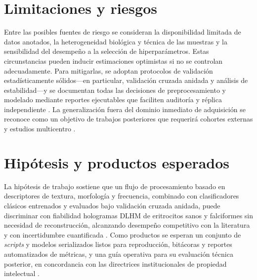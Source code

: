 \section{Limitaciones y riesgos}
Entre las posibles fuentes de riesgo se consideran la disponibilidad limitada de datos anotados, la heterogeneidad biológica y técnica de las muestras y la sensibilidad del desempeño a la selección de hiperparámetros. Estas circunstancias pueden inducir estimaciones optimistas si no se controlan adecuadamente. Para mitigarlas, se adoptan protocolos de validación estadísticamente sólidos—en particular, validación cruzada anidada y análisis de estabilidad—y se documentan todas las decisiones de preprocesamiento y modelado mediante reportes ejecutables que faciliten auditoría y réplica independiente \cite{Vabalas2019,Tsamardinos2022}. La generalización fuera del dominio inmediato de adquisición se reconoce como un objetivo de trabajos posteriores que requerirá cohortes externas y estudios multicentro \cite{BuitragoDuque2023,OConnor2020}.

\section{Hipótesis y productos esperados}
La hipótesis de trabajo sostiene que un flujo de procesamiento basado en descriptores de textura, morfología y frecuencia, combinado con clasificadores clásicos entrenados y evaluados bajo validación cruzada anidada, puede discriminar con fiabilidad hologramas DLHM de eritrocitos sanos y falciformes sin necesidad de reconstrucción, alcanzando desempeño competitivo con la literatura y con incertidumbre cuantificada \cite{Amann2019,BuitragoDuque2023,OConnor2020,Vabalas2019,Tsamardinos2022}. Como productos se esperan un conjunto de \emph{scripts} y modelos serializados listos para reproducción, bitácoras y reportes automatizados de métricas, y una guía operativa para su evaluación técnica posterior, en concordancia con las directrices institucionales de propiedad intelectual \cite{EAFIT2018}.